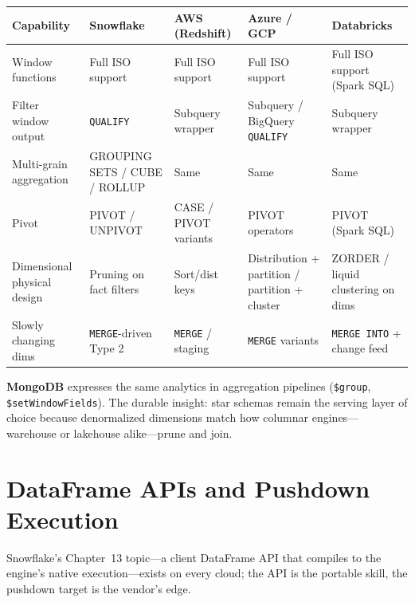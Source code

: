 \begin{center}
\footnotesize
\begin{tabular}{@{}p{2.5cm}p{2.9cm}p{2.7cm}p{2.9cm}p{2.9cm}@{}}
\toprule
\textbf{Capability} & \textbf{Snowflake} & \textbf{AWS (Redshift)} & \textbf{Azure / GCP} & \textbf{Databricks} \\
\midrule
Window functions & Full ISO support & Full ISO support & Full ISO support & Full ISO support (Spark SQL) \\
Filter window output & \texttt{QUALIFY} & Subquery wrapper & Subquery / BigQuery \texttt{QUALIFY} & Subquery wrapper \\
Multi-grain aggregation & GROUPING SETS / CUBE / ROLLUP & Same & Same & Same \\
Pivot & PIVOT / UNPIVOT & CASE / PIVOT variants & PIVOT operators & PIVOT (Spark SQL) \\
Dimensional physical design & Pruning on fact filters & Sort/dist keys & Distribution + partition / partition + cluster & ZORDER / liquid clustering on dims \\
Slowly changing dims & \texttt{MERGE}-driven Type 2 & \texttt{MERGE} / staging & \texttt{MERGE} variants & \texttt{MERGE INTO} + change feed \\
\bottomrule
\end{tabular}
\end{center}

\noindent \textbf{MongoDB} expresses the same analytics in aggregation pipelines
(\texttt{\$group}, \texttt{\$setWindowFields}). The durable insight: star schemas remain the
serving layer of choice because denormalized dimensions match how columnar engines---warehouse
or lakehouse alike---prune and join.

\section{DataFrame APIs and Pushdown Execution}
%
Snowflake's Chapter~13 topic---a client DataFrame API that compiles to the engine's native
execution---exists on every cloud; the API is the portable skill, the pushdown target is the
vendor's edge.

